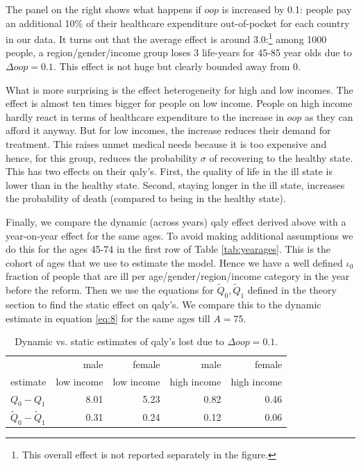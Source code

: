 \documentclass[a4paper,12pt]{article}
\begin{document}
The panel on the right shows what happens if \(oop\) is increased by 0.1: people pay an additional 10\% of their healthcare expenditure out-of-pocket for each country in our data. It turns out that the average effect is around 3.0:\footnote{This overall effect is not reported separately in the figure.} among 1000 people, a region/gender/income group loses 3 life-years for 45-85 year olds due to \(\Delta oop=0.1\). This effect is not huge but clearly bounded away from 0.

What is more surprising is the effect heterogeneity for high and low incomes. The effect is almost ten times bigger for people on low income. People on high income hardly react in terms of healthcare expenditure to the increase in \(oop\) as they can afford it anyway. But for low incomes, the increase reduces their demand for treatment. This raises unmet medical needs because it is too expensive and hence, for this group, reduces the probability \(\sigma\) of recovering to the healthy state. This has two effects on their qaly's. First, the quality of life in the ill state is lower than in the healthy state. Second, staying longer in the ill state, increases the probability of death (compared to being in the healthy state).


Finally, we compare the dynamic (across years) qaly effect derived above with a year-on-year effect for the same ages. To avoid making additional assumptions we do this for the ages 45-74 in the first row of Table \ref{tab:yearages}. This is the cohort of ages that we use to estimate the model. Hence we have a well defined \(\iota_0\) fraction of people that are ill per age/gender/region/income category in the year before the reform. Then we use the equations for \(\tilde Q_0, \tilde Q_1\) defined in the theory section to find the static effect on qaly's. We compare this to the dynamic estimate in equation \eqref{eq:8} for the same ages till \(A=75\).


\begin{table}[htbp]
\caption{\label{tab:dynamic_static}Dynamic vs. static estimates of qaly's lost due to \(\Delta oop = 0.1\).}
\centering
\begin{tabular}{lrrrr}
 & male & female & male & female\\
estimate & low income & low income & high income & high income\\
\hline
\(Q_0 - Q_1\) & 8.01 & 5.23 & 0.82 & 0.46\\
\(\tilde Q_0 - \tilde Q_1\) & 0.31 & 0.24 & 0.12 & 0.06\\
\end{tabular}
\end{table}
\end{document}
